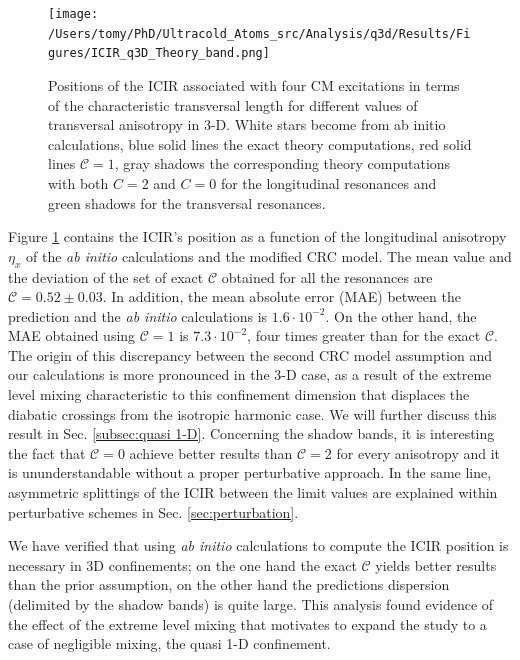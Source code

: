 \documentclass[aps,pre,twocolumn,superscriptaddress,showpacs]{revtex4-1}
\begin{document}
\begin{figure}[htbp!]
 \centering
\texttt{[image: /Users/tomy/PhD/Ultracold\_Atoms\_src/Analysis/q3d/Results/Figures/ICIR\_q3D\_Theory\_band.png]}
 \caption{Positions of the ICIR associated with four CM excitations in terms of the characteristic transversal length for different values of transversal anisotropy in 3-D. White stars become from ab initio calculations, blue solid lines the exact theory computations, red solid lines $\mathcal{C}=1$, gray shadows the corresponding theory computations with both $C=2$ and $C=0$ for the longitudinal resonances and green shadows for the transversal resonances. }
 \label{fig:q3d ICIR}
 \end{figure}

Figure \ref{fig:q3d ICIR} contains the ICIR's position as a function of the longitudinal anisotropy $\eta_x$ of the \textit{ab initio} calculations and the modified CRC model. The mean value and the deviation of the set of exact $\mathcal{C}$ obtained for all the resonances are $\mathcal{C} = 0.52 \pm 0.03$. In addition, the mean absolute error (MAE) between the prediction and the \textit{ab initio} calculations is $1.6 \cdot 10^{-2}$. On the other hand, the MAE obtained using $\mathcal{C} = 1$ is $7.3 \cdot 10^{-2}$, four times greater than for the exact $\mathcal{C}$.  The origin of this discrepancy between the second CRC model assumption and our calculations is more pronounced in the 3-D case, as a result of the extreme level mixing characteristic to this confinement dimension that displaces the diabatic crossings from the isotropic harmonic case. We will further discuss this result in Sec. \ref{subsec:quasi 1-D}.  Concerning the shadow bands, it is interesting the fact that $\mathcal{C} = 0$ achieve better results than $\mathcal{C}=2$ for every anisotropy and it is ununderstandable without a proper perturbative approach. In the same line, asymmetric splittings of the ICIR between the limit values are explained within perturbative schemes in Sec. \ref{sec:perturbation}. 
		 
We have verified that using \textit{ab initio} calculations to compute the ICIR position is necessary in 3D confinements; on the one hand the exact $\mathcal{C}$ yields better results than the prior assumption, on the other hand the predictions dispersion (delimited by the shadow bands) is quite large. This analysis found evidence of the effect of the extreme level mixing that motivates to expand the study to a case of negligible mixing, the quasi 1-D confinement.
\end{document}
